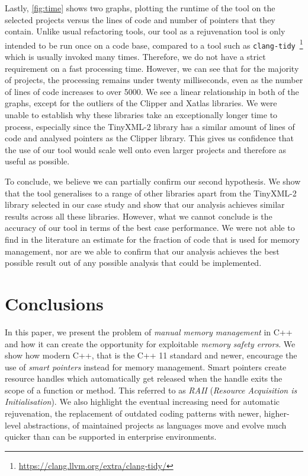 \documentclass{mpaper}
\begin{document}
    Lastly, \autoref{fig:time} shows two graphs, plotting the runtime of the tool on the selected projects versus the lines of code and number of pointers that they contain.
    Unlike usual refactoring tools, our tool as a rejuvenation tool is only intended to be run once on a code base, compared to a tool such as \texttt{clang-tidy}~\footnote{\url{https://clang.llvm.org/extra/clang-tidy/}} which is usually invoked many times. 
    Therefore, we do not have a strict requirement on a fast processing time. 
    However, we can see that for the majority of projects, the processing remains under twenty milliseconds, even as the number of lines of code increases to over 5000. 
    We see a linear relationship in both of the graphs, except for the outliers of the Clipper and Xatlas libraries.
    We were unable to establish why these libraries take an exceptionally longer time to process, especially since the TinyXML-2 library has a similar amount of lines of code and analysed pointers as the Clipper library. 
    This gives us confidence that the use of our tool would scale well onto even larger projects and therefore as useful as possible.
    
    To conclude, we believe we can partially confirm our second hypothesis.
    We show that the tool generalises to a range of other libraries apart from the TinyXML-2 library selected in our case study and show that our analysis achieves similar results across all these libraries. 
    However, what we cannot conclude is the accuracy of our tool in terms of the best case performance. 
    We were not able to find in the literature an estimate for the fraction of code that is used for memory management, nor are we able to confirm that our analysis achieves the best possible result out of any possible analysis that could be implemented.
    
    


    \section{Conclusions}\label{sec:conclusions}
    
    In this paper, we present the problem of \emph{manual memory management} in C++ and how it can create the opportunity for exploitable \emph{memory safety errors}. 
    We show how modern C++, that is the C++ 11 standard and newer, encourage the use of \emph{smart pointers} instead for memory management. 
    Smart pointers create resource handles which automatically get released when the handle exits the scope of a function or method. 
    This referred to as \emph{RAII} (\textit{Resource Acquisition is Initialisation}).
    We also highlight the eventual increasing need for automatic rejuvenation, the replacement of outdated coding patterns with newer, higher-level abstractions, of maintained projects as languages move and evolve much quicker than can be supported in enterprise environments.
    
\end{document}
